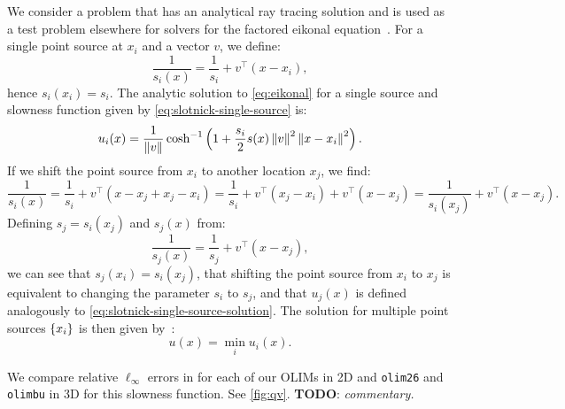 \documentclass[sisc-eikonal.tex]{subfiles}
\begin{document}
We consider a problem that has an analytical ray tracing solution and
is used as a test problem elsewhere for solvers for the factored
eikonal
equation~\cite{slotnick1959lessons,fomel2009fast,qi2018corner}. For a
single point source at $x_i$ and a vector $v$, we define:
\begin{equation}
  \label{eq:slotnick-single-source}
  \frac{1}{s_i(x)} = \frac{1}{s_i} + v^\top {(x - x_i)},
\end{equation}
hence $s_i(x_i) = s_i$. The analytic solution to \cref{eq:eikonal} for a
single source and slowness function given by
\cref{eq:slotnick-single-source} is:
\begin{equation}
  \label{eq:slotnick-single-source-solution}
  u_i(x) = \frac{1}{\norm{v}} \cosh^{-1} \parens{1 + \frac{s_i}{2} s(x) \norm{v}^2 \norm{x - x_i}^2}.
\end{equation}
If we shift the point source from $x_i$ to another location $x_j$, we
find:
\begin{equation}
  \label{eq:slotnick-slowness-shift}
  \frac{1}{s_i(x)} = \frac{1}{s_i} + v^\top {(x - x_j + x_j - x_i)} = \frac{1}{s_i} + v^\top {(x_j - x_i)} + v^\top {(x - x_j)} = \frac{1}{s_i(x_j)} + v^\top {(x - x_j)}.
\end{equation}
Defining $s_j = s_i(x_j)$ and $s_j(x)$ from:
\begin{equation}
  \frac{1}{s_j(x)} = \frac{1}{s_j} + v^\top {(x - x_j)},
\end{equation}
we can see that $s_j(x_i) = s_i(x_j)$, that shifting the point source
from $x_i$ to $x_j$ is equivalent to changing the parameter $s_i$ to
$s_j$, and that $u_j(x)$ is defined analogously to
\cref{eq:slotnick-single-source-solution}. The solution for multiple
point sources $\left\{x_i\right\}$ is then given
by~\cite{fomel2009fast,qi2018corner}:
\begin{equation}
  u(x) = \min_i u_i(x).
\end{equation}

We compare relative $\ell_\infty$ errors in for each of our OLIMs in
2D and \texttt{olim26} and \texttt{olimbu} in 3D for this slowness
function. See \cref{fig:qv}. \textbf{TODO}: \emph{commentary.}
\end{document}

